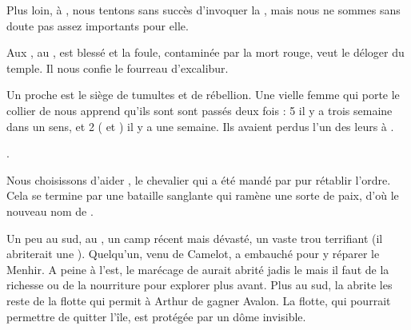 \documentclass[11pt]{article}
\begin{document}
Plus loin, à \lacmiroir{} , nous tentons sans succès d'invoquer la \dame{}, mais nous ne sommes sans doute pas assez importants pour elle.

Aux \marchestitan{}, au \templemere{}, \gauvain{} est blessé et la foule, contaminée par la mort rouge, veut le déloger du temple. Il nous confie le fourreau d'excalibur.



Un \bourgr{} proche est le siège de tumultes et de rébellion. Une vielle femme qui porte le collier de \neante{} nous apprend qu'ils sont sont passés deux fois : 5 il y a trois semaine dans un sens, et 2 (\neante{} et \erfir{}) il y a une semaine. Ils avaient perdus l'un des leurs à \tordracine{}.

.

Nous choisissons d'aider \gaheris{}, le chevalier qui a été mandé par \morgane{} pur rétablir l'ordre. Cela se termine par une bataille sanglante qui ramène une sorte de paix, d'où le nouveau nom de \bourgpacif{}.

Un peu au sud, au \premierfort{}, un camp récent mais dévasté, un vaste trou terrifiant (il abriterait une \guivre{}). Quelqu'un, venu de Camelot, a embauché \erfir{} pour y réparer le Menhir. A peine à l'est, le marécage de \noirbourbe{}  aurait abrité jadis le \monasteremere{} mais il faut de la richesse ou de la nourriture pour explorer plus avant. Plus au sud, la \flotte{}  abrite les reste de la flotte qui permit à Arthur de gagner Avalon. La flotte, qui pourrait permettre de quitter l'île, est protégée par un dôme invisible.

\end{document}
